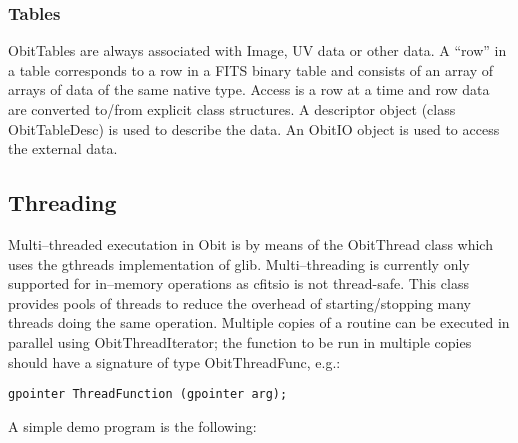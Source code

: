 \documentclass[11pt]{article}
\begin{document}
\subsubsection{Tables}
ObitTables are always associated with Image, UV data or other data.
A ``row'' in a table corresponds to a row in a FITS binary table and
consists of an array of arrays of data of the same native type.
Access is a row at a time and row data are converted to/from explicit
class structures.
A descriptor object (class ObitTableDesc) is used to describe the data.
An ObitIO object is used to access the external data.

\subsection{Threading}
Multi--threaded executation in Obit is by means of the ObitThread
class which uses the gthreads implementation of glib.
Multi--threading is currently only supported for in--memory operations as
cfitsio is not thread-safe.
This class provides pools of threads to reduce the overhead of
starting/stopping many threads doing the same operation.
Multiple copies of a routine can be executed in parallel using
ObitThreadIterator; the function to be run in multiple copies should
have a signature of type ObitThreadFunc, e.g.:
\begin{verbatim}
gpointer ThreadFunction (gpointer arg);
\end{verbatim}
A simple demo program is the following:
\end{document}
